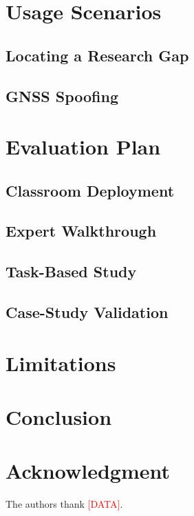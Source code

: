 \documentclass[journal]{IEEEtran}
\newif\ifshowguides
\newcommand{\guide}[1]{%
  \ifshowguides
    {\par\smallskip\footnotesize\color{guidecol}%
     \textsf{\textbf{[guide]}~#1}\par\smallskip}%
  \fi}
\newcommand{\needcite}{\textcolor{red}{[CITE]}}
\newcommand{\needdata}{\textcolor{red}{[DATA]}}
\begin{document}
\section{Usage Scenarios}

\guide{Two scenarios is the right number for five pages; three if you cut
elsewhere. Each should be a task a real analyst has, not a feature tour,
and each should end with an answer the reader could not have obtained
from the sources cited in Section~II.}

\subsection{Locating a Research Gap}


\subsection{GNSS Spoofing}


\section{Evaluation Plan}

\subsection{Classroom Deployment}

\subsection{Expert Walkthrough}

\subsection{Task-Based Study}

\subsection{Case-Study Validation}

\section{Limitations}


\section{Conclusion}


\section*{Acknowledgment}
The authors thank \needdata{}.

\nocite{*}   %


\end{document}
